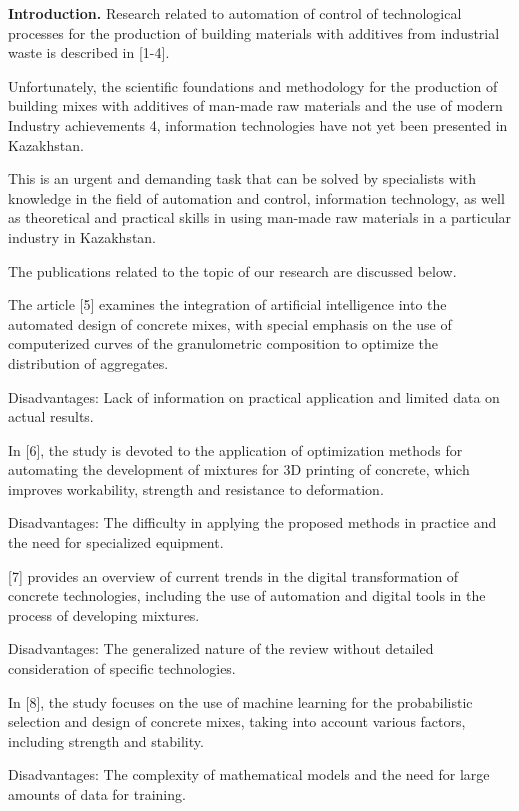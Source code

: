 \begin{multicols}{2}
{\bfseries Introduction.} Research related to automation of control of
technological processes for the production of building materials with
additives from industrial waste is described in {[}1-4{]}.

Unfortunately, the scientific foundations and methodology for the
production of building mixes with additives of man-made raw materials
and the use of modern Industry achievements 4, information technologies
have not yet been presented in Kazakhstan.

This is an urgent and demanding task that can be solved by specialists
with knowledge in the field of automation and control, information
technology, as well as theoretical and practical skills in using
man-made raw materials in a particular industry in Kazakhstan.

The publications related to the topic of our research are discussed
below.

The article {[}5{]} examines the integration of artificial intelligence
into the automated design of concrete mixes, with special emphasis on
the use of computerized curves of the granulometric composition to
optimize the distribution of aggregates.

Disadvantages: Lack of information on practical application and limited
data on actual results.

In {[}6{]}, the study is devoted to the application of optimization
methods for automating the development of mixtures for 3D printing of
concrete, which improves workability, strength and resistance to
deformation.

Disadvantages: The difficulty in applying the proposed methods in
practice and the need for specialized equipment.

{[}7{]} provides an overview of current trends in the digital
transformation of concrete technologies, including the use of automation
and digital tools in the process of developing mixtures.

Disadvantages: The generalized nature of the review without detailed
consideration of specific technologies.

In {[}8{]}, the study focuses on the use of machine learning for the
probabilistic selection and design of concrete mixes, taking into
account various factors, including strength and stability.

Disadvantages: The complexity of mathematical models and the need for
large amounts of data for training.


\end{multicols}
